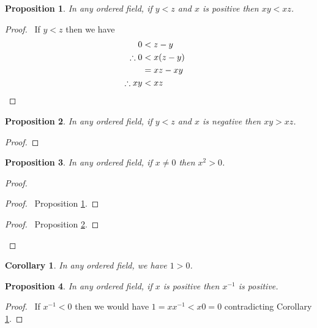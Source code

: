 \documentclass{book}
\let\qed\relax
\newtheorem{prop}{Proposition}[chapter]
\newtheorem{cor}{Corollary}[prop]
\theoremstyle{definition}
\begin{document}
\begin{prop}
\label{prop:multiply_positive}
In any ordered field, if $y < z$ and $x$ is positive then $xy < xz$.
\end{prop}

\begin{proof}
\pf\ If $y < z$ then we have
\begin{align*}
0 & < z - y \\
\therefore 0 & < x(z-y) \\
& = xz - xy \\
\therefore xy & < xz & \qed
\end{align*}
\end{proof}

\begin{prop}
\label{prop:multiply_negative}
In any ordered field, if $y < z$ and $x$ is negative then $xy > xz$.
\end{prop}

\begin{proof}
\pf
{}
\qed
\end{proof}

\begin{prop}
In any ordered field, if $x \neq 0$ then $x^2 > 0$.
\end{prop}

\begin{proof}
\pf
{}
\begin{proof}
	\pf\ Proposition \ref{prop:multiply_positive}.
\end{proof}
\begin{proof}
	\pf\ Proposition \ref{prop:multiply_negative}.
\end{proof}
\qed
\end{proof}

\begin{cor}
\label{cor:one_positive}
In any ordered field, we have $1 > 0$.
\end{cor}

\begin{prop}
\label{prop:inverse_positive}
In any ordered field, if $x$ is positive then $x^{-1}$ is positive.
\end{prop}

\begin{proof}
\pf\ If $x^{-1} < 0$ then we would have $1 = xx^{-1} < x0 = 0$ contradicting Corollary \ref{cor:one_positive}. \qed
\end{proof}
\end{document}
